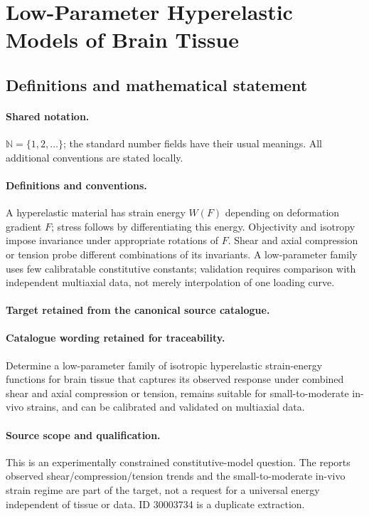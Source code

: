 \documentclass[11pt]{article}
\begin{document}
\section{Low-Parameter Hyperelastic Models of Brain Tissue}\label{statement}

\subsection{Definitions and mathematical statement}

\paragraph{Shared notation.}$\mathbb N=\{1,2,\ldots\}$; the standard number fields have their usual meanings. All additional conventions are stated locally.


\paragraph{Definitions and conventions.}
A hyperelastic material has strain energy $W(F)$ depending on deformation gradient $F$; stress follows by differentiating this energy. Objectivity and isotropy impose invariance under appropriate rotations of $F$. Shear and axial compression or tension probe different combinations of its invariants. A low-parameter family uses few calibratable constitutive constants; validation requires comparison with independent multiaxial data, not merely interpolation of one loading curve.

\paragraph{Target retained from the canonical source catalogue.}
\paragraph{Catalogue wording retained for traceability.}
Determine a low-parameter family of isotropic hyperelastic strain-energy functions for brain tissue that captures its observed response under combined shear and axial compression or tension, remains suitable for small-to-moderate in-vivo strains, and can be calibrated and validated on multiaxial data.

\paragraph{Source scope and qualification.}
This is an experimentally constrained constitutive-model question. The report\textquotesingle s observed shear/compression/tension trends and the small-to-moderate in-vivo strain regime are part of the target, not a request for a universal energy independent of tissue or data. ID 30003734 is a duplicate extraction.
\end{document}

